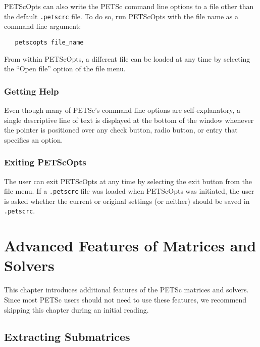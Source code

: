 PETScOpts can also write the PETSc command line options to a file
other than the default {\tt .petscrc} file. To do so, run PETScOpts
with the file name as a command line argument:
\begin{verbatim}
   petscopts file_name
\end{verbatim}
From within PETScOpts, a different file can be loaded at any time
by selecting the ``Open file'' option of the file menu.

\subsection{Getting Help}

Even though many of PETSc's command line options are self-explanatory,
a single descriptive line of text is displayed at the bottom of the
window whenever the pointer is positioned over any check button, radio
button, or entry that specifies an option.

\subsection{Exiting PETScOpts}

The user can exit PETScOpts at any time by selecting the exit
button from the file menu.  If a {\tt .petscrc} file was loaded when
PETScOpts was initiated, the user is asked whether the current or
original settings (or neither) should be saved in {\tt .petscrc}.


\chapter{Advanced Features of Matrices and Solvers}
\label{ch:advanced}

This chapter introduces additional features of the PETSc matrices and solvers.
Since most PETSc users should not need to use these features, 
we recommend skipping this chapter during an initial reading.

\medskip \medskip

\section{Extracting Submatrices} 

